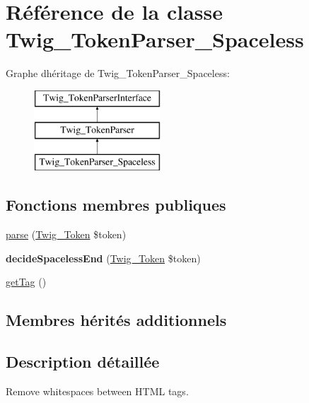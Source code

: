\hypertarget{class_twig___token_parser___spaceless}{}\section{Référence de la classe Twig\+\_\+\+Token\+Parser\+\_\+\+Spaceless}
\label{class_twig___token_parser___spaceless}
Graphe d\textquotesingle{}héritage de Twig\+\_\+\+Token\+Parser\+\_\+\+Spaceless\+:\begin{figure}[H]
\begin{center}
\leavevmode
\includegraphics[height=3.000000cm]{class_twig___token_parser___spaceless}
\end{center}
\end{figure}
\subsection*{Fonctions membres publiques}
\begin{DoxyCompactItemize}
\item 
\hyperlink{class_twig___token_parser___spaceless_a5dfa2e269321584fb74e8b43dabe0efd}{parse} (\hyperlink{class_twig___token}{Twig\+\_\+\+Token} \$token)
\item 
{\bfseries decide\+Spaceless\+End} (\hyperlink{class_twig___token}{Twig\+\_\+\+Token} \$token)\hypertarget{class_twig___token_parser___spaceless_a665a6235e646948edff10a0b0aaff059}{}\label{class_twig___token_parser___spaceless_a665a6235e646948edff10a0b0aaff059}

\item 
\hyperlink{class_twig___token_parser___spaceless_ab86ba36154b20e6bbfa3ba705f12f9d6}{get\+Tag} ()
\end{DoxyCompactItemize}
\subsection*{Membres hérités additionnels}


\subsection{Description détaillée}
Remove whitespaces between H\+T\+ML tags.


